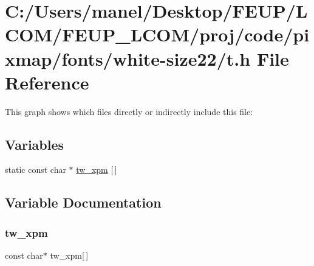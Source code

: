 \hypertarget{white-size22_2t_8h}{}\section{C\+:/\+Users/manel/\+Desktop/\+F\+E\+U\+P/\+L\+C\+O\+M/\+F\+E\+U\+P\+\_\+\+L\+C\+O\+M/proj/code/pixmap/fonts/white-\/size22/t.h File Reference}
\label{white-size22_2t_8h}
This graph shows which files directly or indirectly include this file\+:
\subsection*{Variables}
\begin{DoxyCompactItemize}
\item 
static const char $\ast$ \mbox{\hyperlink{white-size22_2t_8h_aad7e676deff54c48249f9f9a34793267}{tw\+\_\+xpm}} \mbox{[}$\,$\mbox{]}
\end{DoxyCompactItemize}


\subsection{Variable Documentation}
\mbox{\label{white-size22_2t_8h_aad7e676deff54c48249f9f9a34793267}} 
\subsubsection{\texorpdfstring{tw\_xpm}{tw\_xpm}}
{\footnotesize\ttfamily const char$\ast$ tw\+\_\+xpm\mbox{[}$\,$\mbox{]}\hspace{0.3cm}{\ttfamily [static]}}

